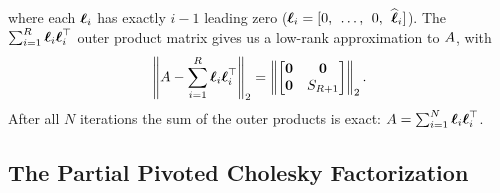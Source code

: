 %
where each $\boldsymbol{\ell}_i$ has exactly $i-1$ leading zero ($\boldsymbol{\ell}_i = [0, \:\: \ldots, \:\: 0, \:\: \widehat {\boldsymbol{\ell}}_i]$).
The $\sum_{i=1}^R \boldsymbol{\ell}_i \boldsymbol{\ell}_i^\top$ outer product matrix gives us a low-rank approximation to $A$, with
\begin{equation}
  \left\Vert A - \sum_{i=1}^{R}{\boldsymbol{\ell}}_{i}{\boldsymbol{\ell}}_{i}^{\top} \right\Vert_{2} = \left\Vert \begin{bmatrix} \mathbf{0} & \mathbf{0} \\ \mathbf{0} & S_{R+1} \end{bmatrix} \right\Vert_2.
  \label{eqn:chol_low_rank}
\end{equation}
After all $N$ iterations the sum of the outer products is exact: $A = \sum_{i=1}^N \boldsymbol{\ell}_i \boldsymbol{\ell}_i^\top$.


\subsection{The Partial Pivoted Cholesky Factorization}
\label{sec:piv_chol}

